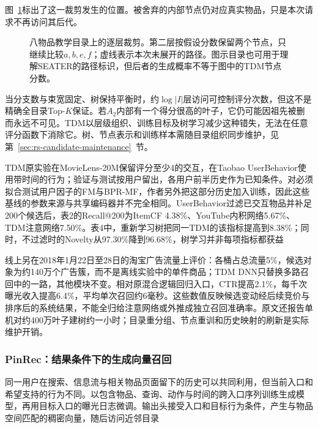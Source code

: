 图~\ref{fig:rs-tree-retrieval}标出了这一裁剪发生的位置。被舍弃的内部节点仍对应真实物品，只是本次请求不再访问其后代。
\begin{figure}[htbp]
 \centering
 
 \caption{八物品教学目录上的逐层裁剪。第二层按假设分数保留两个节点，只继续比较$a,b,e,f$；虚线表示本次未展开的路径。图示目录也可用于理解SEATER的路径标识，但后者的生成概率不等于图中的TDM节点分数。}
 \label{fig:rs-tree-retrieval}
\end{figure}

当分支数与束宽固定、树保持平衡时，约$\log |I|$层访问可控制评分次数，但这不是精确全目录Top-$K$保证。若$A_2$内部有一个得分很高的叶子，它仍可能因祖先被删而永远不可见。TDM以层级组织、训练目标及树学习减少这种错失，无法在任意评分函数下消除它。树、节点表示和训练样本需随目录组织同步维护，见第~\ref{sec:rs-candidate-maintenance}~节。

TDM原实验在MovieLens-20M保留评分至少4的交互，在Taobao UserBehavior使用带时间的行为；验证与测试按用户留出，各用户前半历史作为已知条件。对必须拟合测试用户因子的FM与BPR-MF，作者另外把这部分历史加入训练，因此这些基线的参数来源与共享编码器并不完全相同。UserBehavior过滤已交互物品并补足200个候选后，表2的Recall@200为ItemCF 4.38\%、YouTube内积网络5.67\%、TDM注意网络7.50\%。表4中，重新学习树把同一TDM的该指标提高到8.38\%；同时，不过滤时的Novelty从97.30\%降到96.68\%，树学习并非每项指标都获益

线上另在2018年1月22日至28日的淘宝广告流量上评价：各桶占总流量5\%，候选对象为约140万个广告簇，而不是离线实验中的单件商品；TDM DNN只替换多路召回中的一路，其他模块不变。相对原混合逻辑回归入口，CTR提高2.1\%，每千次曝光收入提高6.4\%，平均单次召回约6毫秒。这些数值反映候选变动经后续竞价与排序后的系统结果，不能全归给注意网络或外推成独立召回准确率。原文还报告单机对约400万叶子建树约一小时；目录重分组、节点重训和历史映射的刷新是实际维护开销。

\Needspace{85mm}
\subsubsection{PinRec：结果条件下的生成向量召回}
\label{sec:rs-pinrec}

同一用户在搜索、信息流与相关物品页面留下的历史可以共同利用，但当前入口和希望支持的行为不同。以包含物品、查询、动作与时间的跨入口序列训练生成模型，再用目标入口的曝光日志微调。输出头接受入口和目标行为条件，产生与物品空间匹配的稠密向量，随后访问近邻目录

